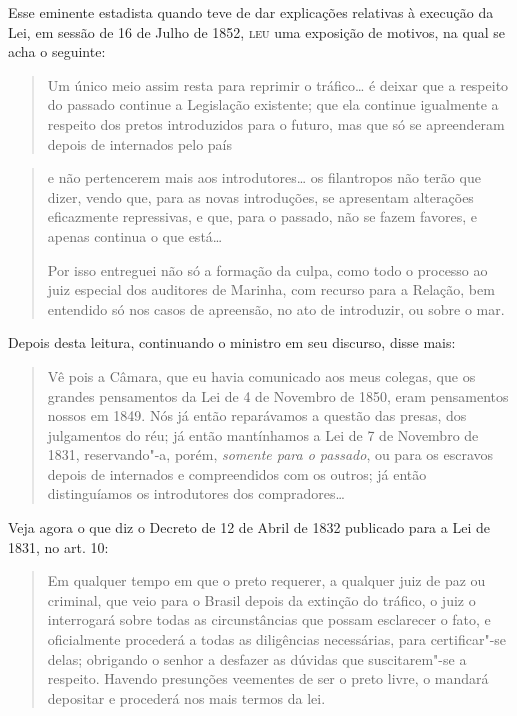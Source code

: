 Esse eminente estadista quando teve de dar explicações relativas à
execução da Lei, em sessão de 16 de Julho de 1852, \textsc{leu} uma exposição de
motivos, na qual se acha o seguinte:

\begin{quote}
Um único meio assim resta para reprimir o tráfico\ldots{} é deixar que a
respeito do passado continue a Legislação existente; que ela continue
igualmente a respeito dos pretos introduzidos para o futuro, mas que só
se apreenderam depois de internados pelo 
país  \linebreak
\end{quote}

\begin{quote}
e não pertencerem mais aos introdutores\ldots{} os filantropos não
terão que dizer, vendo que, para as
novas introduções, se
apresentam alterações eficazmente repressivas, e
que, para o passado, não se fazem favores, e apenas continua o que
está\ldots{}

Por isso entreguei não só a formação da culpa, como todo o processo ao
juiz especial dos auditores de Marinha, com recurso para a Relação, bem
entendido só nos casos de apreensão, no ato de introduzir, ou sobre o
mar.
\end{quote}

Depois desta leitura, continuando o ministro em seu discurso, disse mais:

\begin{quote}
Vê pois a Câmara, que eu havia comunicado aos meus colegas, que os
grandes pensamentos da Lei de 4 de Novembro de 1850, eram pensamentos
nossos em 1849. Nós já então reparávamos a questão das presas, dos
julgamentos do réu; já então mantínhamos a Lei de 7 de Novembro de 1831,
reservando"-a, porém, \emph{somente para o passado}, ou para os escravos
depois de internados e compreendidos com os outros; já então
distinguíamos os introdutores dos compradores\ldots{}
\end{quote}

Veja agora o que diz o Decreto de 12 de Abril de 1832 publicado para a
Lei de 1831, no art. 10:

\begin{quote}
Em qualquer tempo em que o preto requerer, a qualquer juiz de paz ou
criminal, que veio para o Brasil depois da extinção do tráfico, o juiz o
interrogará sobre todas as circunstâncias que possam esclarecer o fato,
e oficialmente procederá a todas as diligências necessárias, para
certificar"-se delas; obrigando o senhor a desfazer as dúvidas que
suscitarem"-se a respeito. Havendo presunções veementes de ser o preto
livre, o mandará depositar e procederá nos mais termos da lei.
\end{quote}

